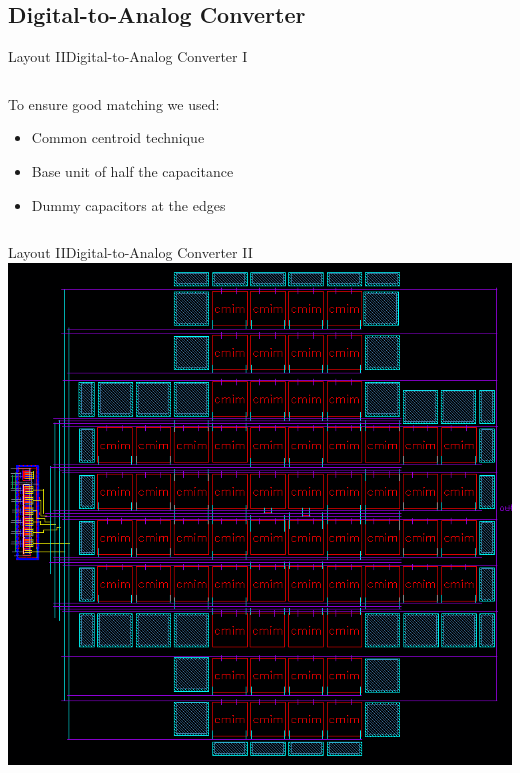 \documentclass{beamer}
\begin{document}
 \subsection{Digital-to-Analog Converter}
 \begin{frame}{Layout II}{Digital-to-Analog Converter I}
    \begin{columns}
    \begin{column}{0.40\linewidth}
    To ensure good matching we used: 
    \begin{itemize}
        \item Common centroid technique
        \item<2-> Base unit of half the capacitance
        \item<3-> Dummy capacitors at the edges
    \end{itemize}
    \vspace{3em}
    \end{column}
    \begin{column}{0.60\linewidth}
        \centering
    \end{column}
    \end{columns}
 \end{frame}
 
 \begin{frame}{Layout II}{Digital-to-Analog Converter II}
     \centering
     \includegraphics[height=.9\textheight]{img/layout}
 \end{frame}
 
\end{document}
